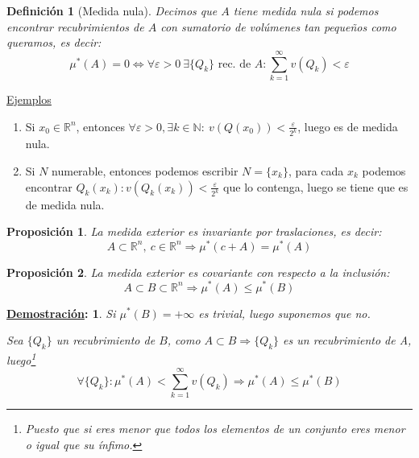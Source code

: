 \documentclass[10pt,a4paper,openright]{book}
\theoremstyle{break}
\newtheorem*{defi}{Definición}
\newtheorem*{prop}{Proposición}
\newtheorem*{demo}{\underline{Demostración}:}
\begin{document}
\begin{defi}[Medida nula]
Decimos que $A$ tiene medida nula si podemos encontrar recubrimientos de $A$ con sumatorio de volúmenes tan pequeños como queramos, es decir:
$$\mu^{*}\left( A \right) = 0 \iff \forall \varepsilon > 0 \ \exists \{Q_k\} \text{ rec. de } A: \sum_{k=1}^{\infty} v\left( Q_k \right) < \varepsilon $$  
\end{defi}

\underline{Ejemplos}
	\begin{enumerate}
       \item Si $x_0 \in \mathbb{R}^{n}$, entonces $\forall \varepsilon > 0, \exists k \in \mathbb N: \ v\left( Q\left( x_0 \right)  \right) < \frac{\varepsilon}{2^{k}}$, luego es de medida nula.
       \item Si $N$ numerable, entonces podemos escribir $N = \{x_k\}$, para cada $x_k$ podemos encontrar $Q_k\left( x_k \right): v\left( Q_k\left( x_k \right)  \right) < \frac{\varepsilon}{2^{k}}$ que lo contenga, luego se tiene que es de medida nula.
    \end{enumerate}
    
\begin{prop}
La medida exterior es invariante por traslaciones, es decir:
$$A \subset \mathbb{R}^{n}, \ c \in \mathbb{R}^{n} \Rightarrow \mu^{*}\left( c + A \right) = \mu^{*}\left( A \right) $$ 
\end{prop}

\begin{prop}
La medida exterior es covariante con respecto a la inclusión:
$$A \subset B \subset \mathbb{R}^{n} \Rightarrow \mu^{*}\left( A \right) \le \mu^{*}\left( B \right) $$
\end{prop}
\begin{demo}
Si $\mu^{*}\left( B \right) = +\infty$ es trivial, luego suponemos que no.

Sea $\{Q_k\}$ un recubrimiento de $B$, como $A \subset B \Rightarrow \{Q_k\}$ es un recubrimiento de A, luego\footnote{Puesto que si eres menor que todos los elementos de un conjunto eres menor o igual que su ínfimo.}
$$\forall \{Q_k\}: \mu^{*}\left( A \right) < \sum_{k=1}^{\infty} v\left( Q_k \right) \Rightarrow \mu^{*}\left( A \right) \le \mu^{*}\left( B \right) $$
\end{demo}
\end{document}
